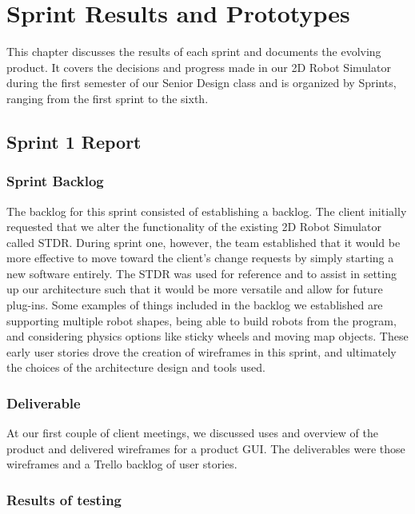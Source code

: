 

\chapter{Sprint Results and Prototypes}

This chapter discusses the results of each sprint and documents the evolving product.    It covers the decisions and progress made in our 2D Robot Simulator during the first semester of our Senior Design class and is organized by Sprints, ranging from the first sprint to the sixth.    

\section{Sprint 1 Report}
\subsection{Sprint Backlog}

The backlog for this sprint consisted of establishing a backlog. The client initially requested that we alter the functionality of the existing 2D Robot Simulator called STDR. During sprint one, however, the team established that it would be more effective to move toward the client's change requests by simply starting a new software entirely. The STDR was used for reference and to assist in setting up our architecture such that it would be more versatile and allow for future plug-ins. Some examples of things included in the backlog we established are supporting multiple robot shapes, being able to build robots from the program, and considering physics options like sticky wheels and moving map objects. These early user stories drove the creation of wireframes in this sprint, and ultimately the choices of the architecture design and tools used.

\subsection{Deliverable}

At our first couple of client meetings, we discussed uses and overview of the product and delivered wireframes for a product GUI. The deliverables were those wireframes and a Trello backlog of user stories.

\subsection{Results of testing}

